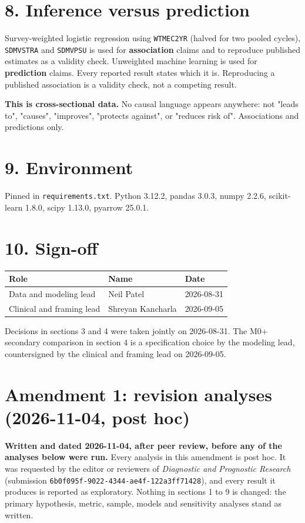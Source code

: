 \documentclass[11pt]{article}
\begin{document}
\section*{8. Inference versus prediction}

Survey-weighted logistic regression using \texttt{WTMEC2YR} (halved for two pooled cycles), \texttt{SDMVSTRA} and \texttt{SDMVPSU} is used for \textbf{association} claims and to reproduce published estimates as a validity check. Unweighted machine learning is used for \textbf{prediction} claims. Every reported result states which it is. Reproducing a published association is a validity check, not a competing result.

\textbf{This is cross-sectional data.} No causal language appears anywhere: not "leads to", "causes", "improves", "protects against", or "reduces risk of". Associations and predictions only.

\section*{9. Environment}

Pinned in \texttt{requirements.txt}. Python 3.12.2, pandas 3.0.3, numpy 2.2.6, scikit-learn 1.8.0, scipy 1.13.0, pyarrow 25.0.1.

\section*{10. Sign-off}

\begin{longtable}{L{5.5cm}L{4cm}L{3cm}}
\toprule
Role & Name & Date \\
\midrule
\endhead
Data and modeling lead & Neil Patel & 2026-08-31 \\
Clinical and framing lead & Shreyan Kancharla & 2026-09-05 \\
\bottomrule
\end{longtable}

Decisions in sections 3 and 4 were taken jointly on 2026-08-31. The M0+ secondary comparison in section 4 is a specification choice by the modeling lead, countersigned by the clinical and framing lead on 2026-09-05.


\clearpage
\section*{Amendment 1: revision analyses (2026-11-04, post hoc)}
\textbf{Written and dated 2026-11-04, after peer review, before any of the analyses below were run.} Every analysis in this amendment is post hoc. It was requested by the editor or reviewers of \textit{Diagnostic and Prognostic Research} (submission \texttt{6b0f095f-9022-4344-ae4f-122a3ff71428}), and every result it produces is reported as exploratory. Nothing in sections 1 to 9 is changed: the primary hypothesis, metric, sample, models and sensitivity analyses stand as written.
\end{document}
